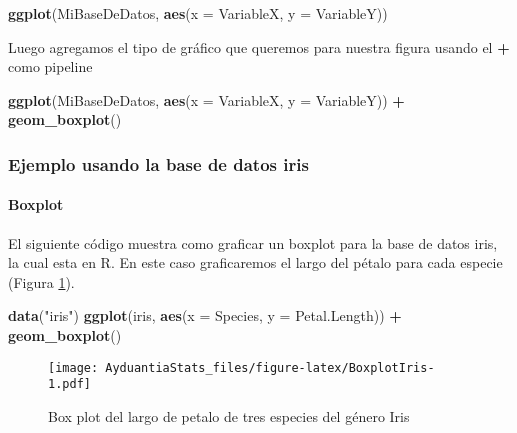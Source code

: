 \documentclass[]{book}
\newenvironment{Shaded}{\begin{snugshade}}{\end{snugshade}}
\newcommand{\DataTypeTok}[1]{\textcolor[rgb]{0.13,0.29,0.53}{#1}}
\newcommand{\KeywordTok}[1]{\textcolor[rgb]{0.13,0.29,0.53}{\textbf{#1}}}
\newcommand{\NormalTok}[1]{#1}
\newcommand{\OperatorTok}[1]{\textcolor[rgb]{0.81,0.36,0.00}{\textbf{#1}}}
\newcommand{\StringTok}[1]{\textcolor[rgb]{0.31,0.60,0.02}{#1}}
\let\oldparagraph\paragraph
\renewcommand{\paragraph}[1]{\oldparagraph{#1}\mbox{}}
\begin{document}
\begin{Shaded}
\begin{Highlighting}[]
\KeywordTok{ggplot}\NormalTok{(MiBaseDeDatos, }\KeywordTok{aes}\NormalTok{(}\DataTypeTok{x =}\NormalTok{ VariableX, }\DataTypeTok{y =}\NormalTok{ VariableY)) }
\end{Highlighting}
\end{Shaded}

Luego agregamos el tipo de gráfico que queremos para nuestra figura usando el \textbf{+} como pipeline

\begin{Shaded}
\begin{Highlighting}[]
\KeywordTok{ggplot}\NormalTok{(MiBaseDeDatos, }\KeywordTok{aes}\NormalTok{(}\DataTypeTok{x =}\NormalTok{ VariableX, }\DataTypeTok{y =}\NormalTok{ VariableY)) }\OperatorTok{+}\StringTok{ }\KeywordTok{geom_boxplot}\NormalTok{()}
\end{Highlighting}
\end{Shaded}

\hypertarget{ejemplo-usando-la-base-de-datos-iris}{%
\subsubsection{Ejemplo usando la base de datos iris}\label{ejemplo-usando-la-base-de-datos-iris}}

\hypertarget{boxplot}{%
\paragraph{Boxplot}\label{boxplot}}

El siguiente código muestra como graficar un boxplot para la base de datos iris, la cual esta en R. En este caso graficaremos el largo del pétalo para cada especie (Figura \ref{fig:BoxplotIris}).

\begin{Shaded}
\begin{Highlighting}[]
\KeywordTok{data}\NormalTok{(}\StringTok{"iris"}\NormalTok{)}
\KeywordTok{ggplot}\NormalTok{(iris, }\KeywordTok{aes}\NormalTok{(}\DataTypeTok{x =}\NormalTok{ Species, }\DataTypeTok{y =}\NormalTok{ Petal.Length)) }\OperatorTok{+}\StringTok{ }\KeywordTok{geom_boxplot}\NormalTok{()}
\end{Highlighting}
\end{Shaded}

\begin{figure}
\centering
\texttt{[image: AyduantiaStats\_files/figure-latex/BoxplotIris-1.pdf]}
\caption{\label{fig:BoxplotIris}Box plot del largo de petalo de tres especies del género Iris}
\end{figure}
\end{document}
